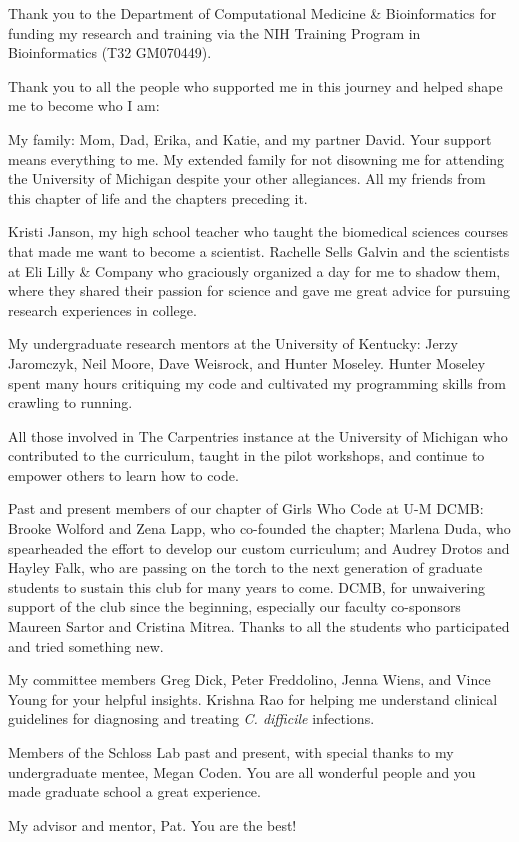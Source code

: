 Thank you to the Department of Computational Medicine \& Bioinformatics for
funding my research and training via the NIH Training Program in Bioinformatics
(T32 GM070449).

Thank you to all the people who supported me in this journey and helped shape me
to become who I am:

My family: Mom, Dad, Erika, and Katie, and my partner David.
Your support means everything to me.
My extended family for not disowning me for attending the University of Michigan
despite your other allegiances.
All my friends from this chapter of life and the chapters preceding it.

Kristi Janson, my high school teacher who taught the biomedical sciences
courses that made me want to become a scientist.
Rachelle Sells Galvin and the scientists at Eli Lilly \& Company
who graciously organized a day for me to shadow them,
where they shared their passion for science and gave me great advice for
pursuing research experiences in college.

My undergraduate research mentors at the University of Kentucky:
Jerzy Jaromczyk, Neil Moore, Dave Weisrock, and Hunter Moseley.
Hunter Moseley spent many hours critiquing my code and cultivated my programming
skills from crawling to running.

All those involved in The Carpentries instance at the University of Michigan who
contributed to the curriculum, taught in the pilot workshops, and continue to
empower others to learn how to code.

Past and present members of our chapter of Girls Who Code at U-M DCMB:
Brooke Wolford and Zena Lapp, who co-founded the chapter;
Marlena Duda, who spearheaded the effort to develop our custom curriculum; and
Audrey Drotos and Hayley Falk, who are passing on the torch to the next
generation of graduate students to sustain this club for many years to come.
DCMB, for unwaivering support of the club since the beginning, especially our
faculty co-sponsors Maureen Sartor and Cristina Mitrea.
Thanks to all the students who participated and tried something new.

My committee members Greg Dick, Peter Freddolino, Jenna Wiens, and Vince Young
for your helpful insights.
Krishna Rao for helping me understand clinical guidelines for diagnosing
and treating \textit{C. difficile} infections.

Members of the Schloss Lab past and present, with special thanks to my
undergraduate mentee, Megan Coden.
You are all wonderful people and you made graduate school a great experience.

My advisor and mentor, Pat. You are the best!
